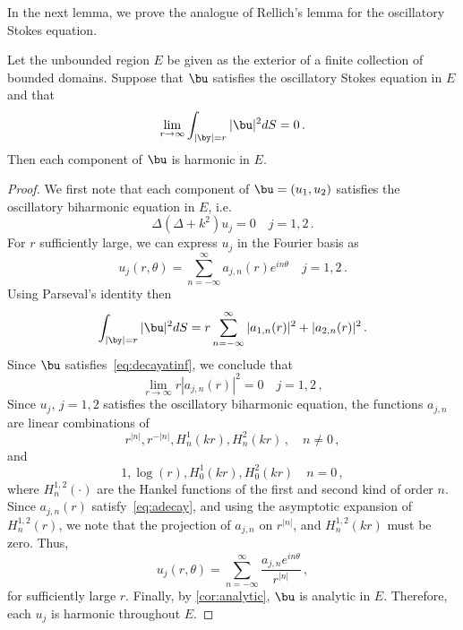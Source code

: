 In the next lemma, we prove the analogue of Rellich's lemma for the
oscillatory Stokes equation. 
\begin{lem}
  \label{lem:rellich}
    Let the unbounded region $E$ be given as the exterior
  of a finite collection of bounded domains.
  Suppose that $\bu$ satisfies the oscillatory Stokes equation in
  $E$ and that 
\begin{equation}
\lim_{r \to \infty} \int_{|\by|=r} |\bu|^2 dS = 0 
\, . \label{eq:decayatinf}
\end{equation}
Then each component of $\bu$ is harmonic in $E$.
\end{lem}
\begin{proof}
We first note that each component of $\bu= (u_{1},u_{2})$ satisfies the 
oscillatory biharmonic equation in $E$, i.e.
\begin{equation}
\Delta (\Delta + k^2) u_{j} = 0 \quad j=1,2 \,. \nonumber
\end{equation}
For $r$ sufficiently large, we can express $u_{j}$ in the Fourier basis as
\begin{equation}
u_{j}(r,\theta) = \sum_{n=-\infty}^{\infty} a_{j,n}(r) e^{i n \theta}  \quad 
j=1,2 \, . \nonumber
\end{equation}
Using Parseval's identity then
\begin{equation}
\int_{|\by|=r} |\bu|^2 dS = r\sum_{n=-\infty}^{\infty} |a_{1,n}(r)|^2  +
|a_{2,n}(r)|^2 \, . \nonumber
\end{equation}
Since $\bu$ satisfies~\cref{eq:decayatinf}, we conclude that
\begin{equation}
\lim_{r\to\infty} r|a_{j,n}(r)|^2 = 0 \quad j=1,2 \, , \label{eq:adecay}
\end{equation}
Since $u_{j}$, $j=1,2$ satisfies the oscillatory biharmonic equation,
the functions $a_{j,n}$ are linear combinations of 
\begin{equation}
r^{|n|}, r^{-|n|}, H^{1}_{n}(k r), H^{2}_{n}(k r) \, , \quad
n\neq 0 \, , \nonumber
\end{equation}
and
\begin{equation}
1, \log{(r)}, H^{1}_{0}(k r), H^{2}_{0}(k r) \quad n=0 \, ,  \nonumber
\end{equation} 
where $H_{n}^{1,2}(\cdot)$ are the Hankel functions of the first and
second kind of order $n$.
Since $a_{j,n}(r)$ satisfy~\cref{eq:adecay}, and using the asymptotic 
expansion of $H_{n}^{1,2}(r)$, we note that the projection of 
$a_{j,n}$ on $r^{|n|}$, and $H_{n}^{1,2}(k r)$ must be zero. 
Thus, 
\begin{equation}
u_{j}(r,\theta) = \sum_{n=-\infty}^{\infty} \frac{a_{j,n} e^{i n \theta}}{r^{|n|}} 
\, , \nonumber
\end{equation}
for sufficiently large $r$.
Finally, by \cref{cor:analytic}, $\bu$ is
analytic in $E$. Therefore, each $u_j$ is harmonic
throughout $E$.
\end{proof}
